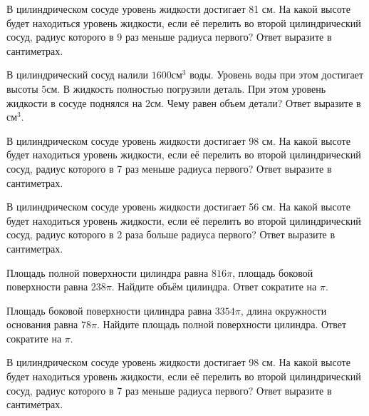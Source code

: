 \documentclass[4apaper]{article}
\begin{document}
\begin{taskBN}{8}
В цилиндрическом сосуде уровень жидкости достигает 81 см. На какой высоте будет находиться уровень жидкости, если её перелить во второй цилиндрический сосуд, радиус которого в 9 раз меньше радиуса первого? Ответ выразите в сантиметрах.
\end{taskBN}

\begin{taskBN}{9}
В цилиндрический сосуд налили $1600\mbox{см}^3$ воды. Уровень воды при этом достигает высоты $5$см. В жидкость полностью погрузили деталь. При этом уровень жидкости в сосуде поднялся на $2$см. Чему равен объем детали? Ответ выразите в $\mbox{см}^3$.
\end{taskBN}

\begin{taskBN}{10}
В цилиндрическом сосуде уровень жидкости достигает 98 см. На какой высоте будет находиться уровень жидкости, если её перелить во второй цилиндрический сосуд, радиус которого в 7 раз меньше радиуса первого? Ответ выразите в сантиметрах.
\end{taskBN}

\begin{taskBN}{11}
В цилиндрическом сосуде уровень жидкости достигает 56 см. На какой высоте будет находиться уровень жидкости, если её перелить во второй цилиндрический сосуд, радиус которого в 2 раза больше радиуса первого? Ответ выразите в сантиметрах.
\end{taskBN}

\begin{taskBN}{12}
Площадь полной поверхности цилиндра равна $816\pi$, площадь боковой поверхности равна $238\pi$. Найдите объём цилиндра. Ответ сократите на $\pi$.
\end{taskBN}

\begin{taskBN}{13}
Площадь боковой поверхности цилиндра равна $3354\pi$, длина окружности основания равна $78\pi$. Найдите площадь полной поверхности цилиндра. Ответ сократите на $\pi$.
\end{taskBN}

\begin{taskBN}{14}
В цилиндрическом сосуде уровень жидкости достигает 98 см. На какой высоте будет находиться уровень жидкости, если её перелить во второй цилиндрический сосуд, радиус которого в 7 раз меньше радиуса первого? Ответ выразите в сантиметрах.
\end{taskBN}
\end{document}
